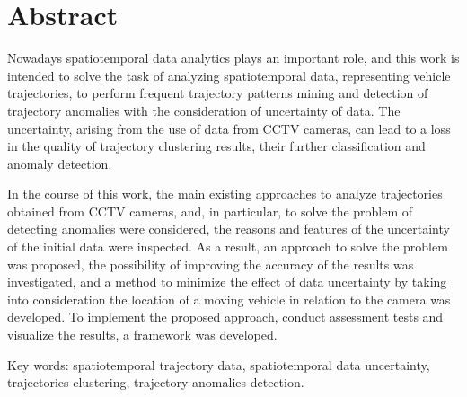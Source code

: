 \chapter*{Abstract}
\thispagestyle{empty}

Nowadays spatiotemporal data analytics plays an important role, and this work is intended to solve the task of analyzing spatiotemporal data, representing vehicle trajectories, to perform frequent trajectory patterns mining and detection of trajectory anomalies with the consideration of uncertainty of data. The uncertainty, arising from the use of data from CCTV cameras, can lead to a loss in the quality of trajectory clustering results, their further classification and anomaly detection.

In the course of this work, the main existing approaches to analyze trajectories obtained from CCTV cameras, and, in particular, to solve the problem of detecting anomalies were considered, the reasons and features of the uncertainty of the initial data were inspected. As a result, an approach to solve the problem was proposed, the possibility of improving the accuracy of the results was investigated, and a method to minimize the effect of data uncertainty by taking into consideration the location of a moving vehicle in relation to the camera was developed. To implement the proposed approach, conduct assessment tests and visualize the results, a framework was developed.

\bigbreak
Key words: spatiotemporal trajectory data, spatiotemporal data uncertainty, trajectories clustering, trajectory anomalies detection.